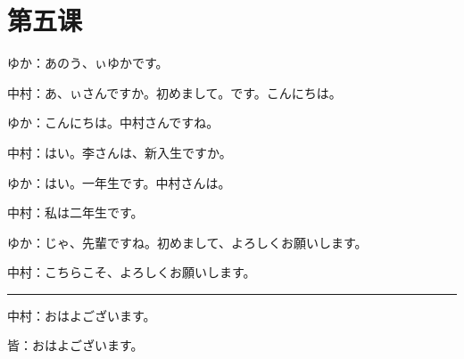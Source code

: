 \langJP

\section{第五课 }


ゆか：あのう、ぃゆかです。

中村：あ、ぃさんですか。初めまして。です。こんにちは。

ゆか：こんにちは。中村さんですね。

中村：はい。李さんは、新入生ですか。

ゆか：はい。一年生です。中村さんは。

中村：私は二年生です。

ゆか：じゃ、先輩ですね。初めまして、よろしくお願いします。

中村：こちらこそ、よろしくお願いします。

\rule{5cm}{1pt}

中村：おはよございます。

皆：おはよございます。
